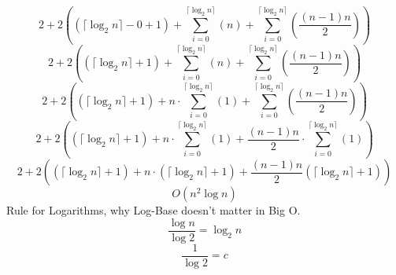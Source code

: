 \documentclass{article}
\begin{document}
$$2+2\left(\left(\lceil\log_2n\rceil-0+1\right)+\sum_{i=0}^{\lceil\log_2n\rceil}\left(n\right)+\sum_{i=0}^{\lceil\log_2n\rceil}\left(\frac{\left(n-1\right)n}{2}\right)\right)$$
$$2+2\left(\left(\lceil\log_2n\rceil+1\right)+\sum_{i=0}^{\lceil\log_2n\rceil}\left(n\right)+\sum_{i=0}^{\lceil\log_2n\rceil}\left(\frac{\left(n-1\right)n}{2}\right)\right)$$
$$2+2\left(\left(\lceil\log_2n\rceil+1\right)+n\cdot\sum_{i=0}^{\lceil\log_2n\rceil}\left(1\right)+\sum_{i=0}^{\lceil\log_2n\rceil}\left(\frac{\left(n-1\right)n}{2}\right)\right)$$
$$2+2\left(\left(\lceil\log_2n\rceil+1\right)+n\cdot\sum_{i=0}^{\lceil\log_2n\rceil}\left(1\right)+\frac{\left(n-1\right)n}{2}\cdot\sum_{i=0}^{\lceil\log_2n\rceil}\left(1\right)\right)$$
$$2+2\left(\left(\lceil\log_2n\rceil+1\right)+n\cdot\left(\lceil\log_2n\rceil+1\right)+\frac{\left(n-1\right)n}{2}\left(\lceil\log_2n\rceil+1\right)\right)$$
$$O(n^2\log n)$$
Rule for Logarithms, why Log-Base doesn't matter in Big O.
$$\frac{\log n}{\log 2}=\log_2 n$$
$$\frac{1}{\log 2}=c$$


\end{document}
